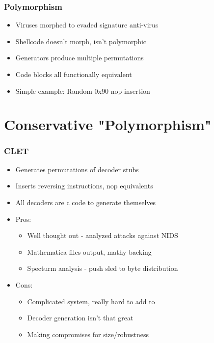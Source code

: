 \documentclass{beamer}
\newenvironment{sitemize}{\vspace{1mm}\begin{itemize}\itemsep 4pt\small}{\end{itemize}}
\begin{document}
\begin{frame}[t]
  \frametitle{Polymorphism}
  \begin{sitemize}
    \item Viruses morphed to evaded signature anti-virus
    \item Shellcode doesn't morph, isn't polymorphic
    \item Generators produce multiple permutations
    \item Code blocks all functionally equivalent
    \item Simple example: Random 0x90 nop insertion
  \end{sitemize}
\end{frame}

\section{Conservative "Polymorphism"}

\begin{frame}[t]
  \frametitle{CLET}
  \begin{sitemize}
    \item Generates permutations of decoder stubs
    \item Inserts reversing instructions, nop equivalents
    \item All decoders are c code to generate themselves
    \pause
    \item Pros:
    \begin{sitemize}
      \item Well thought out - analyzed attacks against NIDS
      \item Mathematica files output, mathy backing
      \item Specturm analysis - push sled to byte distribution
    \end{sitemize}
    \pause
    \item Cons:
    \begin{sitemize}
      \item Complicated system, really hard to add to
      \item Decoder generation isn't that great
      \item Making compromises for size/robustness
    \end{sitemize}
  \end{sitemize}
\end{frame}
\end{document}
